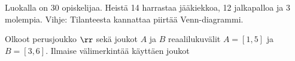 \begin{tehtavasivu}
\begin{tehtava}
%
    
\end{tehtava}



\begin{tehtava}
     Luokalla on 30 opiskelijaa. Heistä 14 harrastaa jääkiekkoa, 12 jalkapalloa ja 3 molempia. 
Vihje: Tilanteesta kannattaa piirtää Venn-diagrammi.
    \begin{vastaus}
    
    \end{vastaus}
    
\end{tehtava}


\begin{tehtava}
     Olkoot perusjoukko $\rr$ sekä joukot $A$ ja $B$ reaalilukuvälit $A=[1, 5]$ ja $B=[3, 6]$. Ilmaise välimerkintää käyttäen joukot


\end{tehtava}
\end{tehtavasivu}
